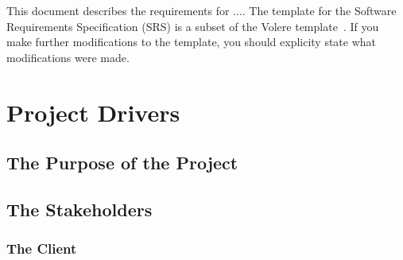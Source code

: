 \documentclass[12pt, titlepage]{article}
\begin{document}







\tableofcontents

\listoftables

\listoffigures


\newpage


This document describes the requirements for ....  The template for the Software
Requirements Specification (SRS) is a subset of the Volere
template~\citep{RobertsonAndRobertson2012}.  If you make further modifications
to the template, you should explicity state what modifications were made.

\section{Project Drivers}



\subsection{The Purpose of the Project}

\subsection{The Stakeholders}

\subsubsection{The Client}
\end{document}
